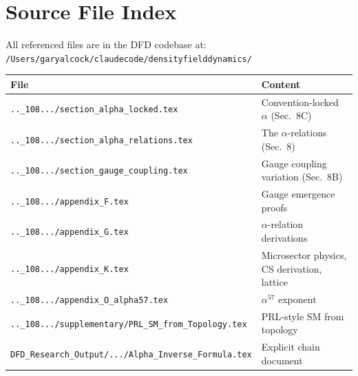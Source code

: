 \documentclass[12pt,a4paper]{article}
\begin{document}
\section*{Source File Index}

All referenced files are in the DFD codebase at:\\
\texttt{/Users/garyalcock/claudecode/densityfielddynamics/}

\begin{center}
\small
\renewcommand{\arraystretch}{1.1}
\begin{tabular}{ll}
\toprule
\textbf{File} & \textbf{Content} \\
\midrule
\texttt{..\_108.../section\_alpha\_locked.tex}
  & Convention-locked $\alpha$ (Sec.~8C) \\
\texttt{..\_108.../section\_alpha\_relations.tex}
  & The $\alpha$-relations (Sec.~8) \\
\texttt{..\_108.../section\_gauge\_coupling.tex}
  & Gauge coupling variation (Sec.~8B) \\
\texttt{..\_108.../appendix\_F.tex}
  & Gauge emergence proofs \\
\texttt{..\_108.../appendix\_G.tex}
  & $\alpha$-relation derivations \\
\texttt{..\_108.../appendix\_K.tex}
  & Microsector physics, CS derivation, lattice \\
\texttt{..\_108.../appendix\_O\_alpha57.tex}
  & $\alpha^{57}$ exponent \\
\texttt{..\_108.../supplementary/PRL\_SM\_from\_Topology.tex}
  & PRL-style SM from topology \\
\texttt{DFD\_Research\_Output/.../Alpha\_Inverse\_Formula.tex}
  & Explicit chain document \\
\bottomrule
\end{tabular}
\end{center}
\end{document}
